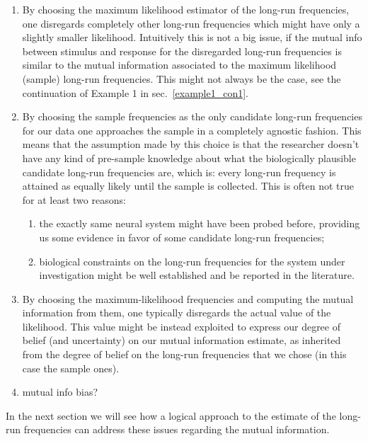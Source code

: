 \begin{enumerate}
\item By choosing the maximum likelihood estimator of the long-run frequencies, one disregards completely other long-run frequencies which might have only a slightly smaller likelihood. Intuitively this is not a big issue, if the mutual info between stimulus and response for the disregarded long-run frequencies is similar to the mutual information associated to the maximum likelihood (sample) long-run frequencies. This might not always be the case, see the continuation of Example 1 in sec.~\ref{example1_con1}. 

\item By choosing the sample frequencies as the only candidate long-run frequencies for our data one approaches the sample in a completely agnostic fashion. This means that the assumption made by this choice is that the researcher doesn't have any kind of pre-sample knowledge about what the biologically plausible candidate long-run frequencies are, which is: every long-run frequency is attained as equally likely until the sample is collected. This is often not true for at least two reasons:
\begin{enumerate}

\item the exactly same neural system might have been probed before, providing us some evidence in favor of some candidate long-run frequencies;

\item biological constraints on the long-run frequencies for the system under investigation might be well established and be reported in the literature.

\end{enumerate}

\item By choosing the maximum-likelihood frequencies and computing the mutual information from them, one typically disregards the actual value of the likelihood. This value might be instead exploited to express our degree of belief (and uncertainty) on our mutual information estimate, as inherited from the degree of belief on the long-run frequencies that we chose (in this case the sample ones).

\item mutual info bias?

\end{enumerate}

In the next section we will see how a logical approach to the estimate of the long-run frequencies can address these issues regarding the mutual information.

